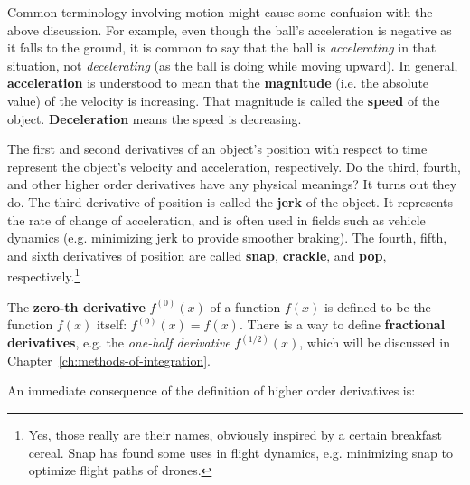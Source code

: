 Common terminology involving motion might cause some confusion with the above
discussion. For example, even though the ball's acceleration is negative as it
falls to the ground, it is common to say that the ball is \emph{accelerating} in
that situation, not \emph{decelerating} (as the ball is doing while moving
upward).
In general, \textbf{acceleration} is understood to mean that the
\textbf{magnitude} (i.e. the absolute value) of the velocity is increasing. That
magnitude is called the \textbf{speed} of the object. \textbf{Deceleration} means
the speed is decreasing.

The first and second derivatives of an object's position with respect to time
represent the object's velocity and acceleration, respectively. Do the
third, fourth, and other higher order derivatives have any physical meanings?
It turns out they do. The third derivative of position is called
the \textbf{jerk} of the object. It represents the rate of change
of acceleration, and is often used in fields such as vehicle dynamics (e.g.
minimizing jerk to provide smoother braking). The fourth, fifth, and sixth
derivatives of position are called \textbf{snap}, \textbf{crackle}, and
\textbf{pop}, respectively.\footnote{Yes, those really are their names,
obviously inspired by a certain breakfast cereal. Snap has found some uses in
flight dynamics, e.g. minimizing snap to optimize flight paths of drones.}

The \textbf{zero-th derivative} $f^{(0)}(x)$ of a
function $f(x)$ is defined to be the function $f(x)$ itself:
$f^{(0)}(x) = f(x)$. There is a way to define \textbf{fractional derivatives},
e.g. the \emph{one-half derivative} $f^{(1/2)}(x)$, which will be discussed
in Chapter~\ref{ch:methods-of-integration}.

An immediate consequence of the definition of higher order derivatives is:

